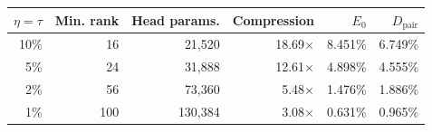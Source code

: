 \begin{tabular}{rrrrrr}
\toprule
$\eta=\tau$ & Min. rank & Head params. & Compression & $E_0$ & $D_{\mathrm{pair}}$ \\
\midrule
10\% & 16 & 21,520 & 18.69$\times$ & 8.451\% & 6.749\% \\
5\% & 24 & 31,888 & 12.61$\times$ & 4.898\% & 4.555\% \\
2\% & 56 & 73,360 & 5.48$\times$ & 1.476\% & 1.886\% \\
1\% & 100 & 130,384 & 3.08$\times$ & 0.631\% & 0.965\% \\
\bottomrule
\end{tabular}
